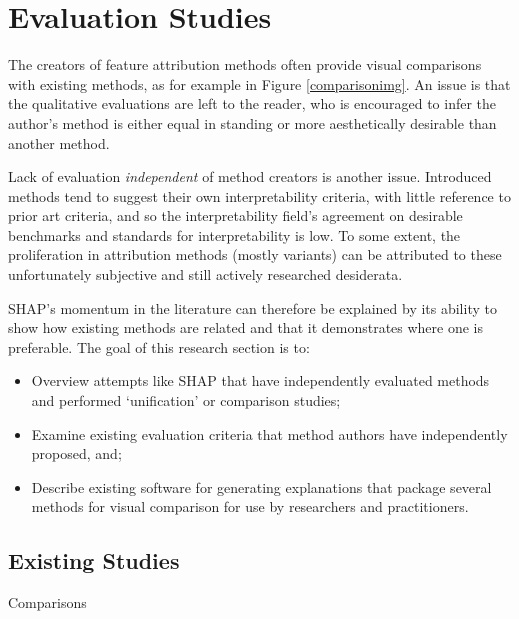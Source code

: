 \documentclass[main]{subfiles}
\begin{document}
\section{Evaluation Studies}

The creators of feature attribution methods often provide visual comparisons with existing methods, as for example in Figure \ref{comparisonimg}. An issue is that the qualitative evaluations are left to the reader, who is encouraged to infer the author's method is either equal in standing or more aesthetically desirable than another method.

Lack of evaluation \textit{independent} of method creators is another issue. Introduced methods tend to suggest their own interpretability criteria, with little reference to prior art criteria, and so the interpretability field's agreement on desirable benchmarks and standards for interpretability is low. To some extent, the proliferation in attribution methods (mostly variants) can be attributed to these unfortunately subjective and still actively researched desiderata.

SHAP's momentum in the literature can therefore be explained by its ability to show how existing methods are related and that it demonstrates where one is preferable. The goal of this research section is to: 

\begin{itemize}

\item Overview attempts like SHAP that have independently evaluated methods and performed `unification' or comparison studies;
\item Examine existing evaluation criteria that method authors have independently proposed, and;
\item Describe existing software for generating explanations that package several methods for visual comparison for use by researchers and practitioners.

\end{itemize}

\subsection{Existing Studies}


Comparisons


\end{document}
